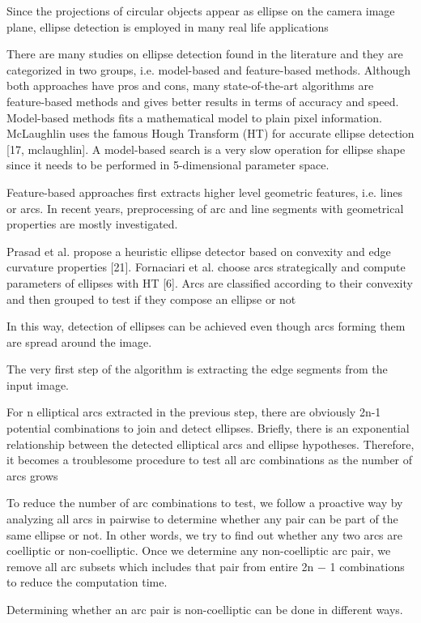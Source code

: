 \documentclass[a4paper]{report}
\begin{document}
Since the projections of circular objects appear as ellipse on the
camera image plane, ellipse detection is employed in many real life applications

There are many studies on ellipse detection found in the literature and
they are categorized in two groups, i.e. model-based and feature-based methods.
Although both approaches have pros and cons, many state-of-the-art algorithms
are feature-based methods and gives better results in terms of accuracy and
speed. Model-based methods fits a mathematical model to plain pixel information.
McLaughlin uses the famous Hough Transform (HT) for accurate ellipse
detection [17, mclaughlin]. A model-based search is a very slow operation for ellipse shape
since it needs to be performed in 5-dimensional parameter space.

Feature-based
approaches first extracts higher level geometric features, i.e. lines or arcs. In
recent years, preprocessing of arc and line segments with geometrical properties
are mostly investigated.

Prasad et al. propose a heuristic ellipse
detector based on convexity and edge curvature properties [21]. Fornaciari et al.
choose arcs strategically and compute parameters of ellipses with HT [6]. Arcs are
classified according to their convexity and then grouped to test if they compose
an ellipse or not

In this way, detection of
ellipses can be achieved even though arcs forming them are spread around
the image.

The very first step of the algorithm is extracting the edge segments from the
input image.

For n elliptical arcs extracted in the previous step, there are obviously 2n-1
potential combinations to join and detect ellipses.
Briefly, there is an exponential relationship between the detected elliptical
arcs and ellipse hypotheses. Therefore, it becomes a troublesome procedure to
test all arc combinations as the number of arcs grows

To reduce the number of arc combinations to test, we follow a proactive
way by analyzing all arcs in pairwise to determine whether any pair can be
part of the same ellipse or not. In other words, we try to find out whether any
two arcs are coelliptic or non-coelliptic. Once we determine any non-coelliptic
arc pair, we remove all arc subsets which includes that pair from entire 2n −
1 combinations to reduce the computation time.

Determining whether an arc
pair is non-coelliptic can be done in different ways.
\end{document}
